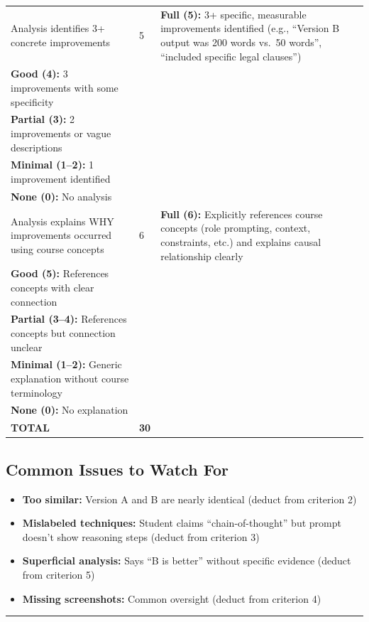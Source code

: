 \documentclass[11pt]{article}
\begin{document}
\begin{longtable}{|p{5cm}|p{2cm}|p{8cm}|}
Analysis identifies 3+ concrete improvements & 5 & 
\textbf{Full (5):} 3+ specific, measurable improvements identified (e.g., ``Version B output was 200 words vs.\ 50 words'', ``included specific legal clauses'') \\
\textbf{Good (4):} 3 improvements with some specificity \\
\textbf{Partial (3):} 2 improvements or vague descriptions \\
\textbf{Minimal (1--2):} 1 improvement identified \\
\textbf{None (0):} No analysis \\
\hline

Analysis explains WHY improvements occurred using course concepts & 6 & 
\textbf{Full (6):} Explicitly references course concepts (role prompting, context, constraints, etc.) and explains causal relationship clearly \\
\textbf{Good (5):} References concepts with clear connection \\
\textbf{Partial (3--4):} References concepts but connection unclear \\
\textbf{Minimal (1--2):} Generic explanation without course terminology \\
\textbf{None (0):} No explanation \\
\hline

\textbf{TOTAL} & \textbf{30} & \\
\hline
\end{longtable}

\subsection*{Common Issues to Watch For}

\begin{itemize}
    \item \textbf{Too similar:} Version A and B are nearly identical (deduct from criterion 2)
    \item \textbf{Mislabeled techniques:} Student claims ``chain-of-thought'' but prompt doesn't show reasoning steps (deduct from criterion 3)
    \item \textbf{Superficial analysis:} Says ``B is better'' without specific evidence (deduct from criterion 5)
    \item \textbf{Missing screenshots:} Common oversight (deduct from criterion 4)
\end{itemize}

\hrule
\vspace{0.5cm}
\end{document}
